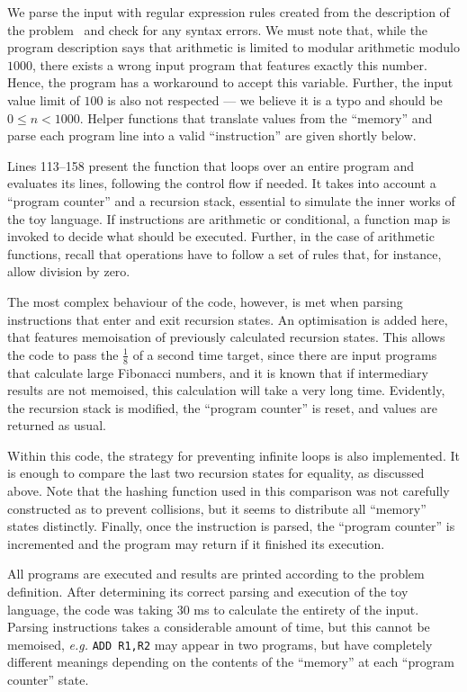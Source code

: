 \documentclass[12pt]{article}
\begin{document}
We parse the input with regular expression rules created from the description of the problem~\cite{Demasi:misc:2013:may} and check for any syntax errors. We must note that, while the program description says that arithmetic is limited to modular arithmetic modulo $1000$, there exists a wrong input program that features exactly this number. Hence, the program has a workaround to accept this variable. Further, the input value limit of $100$ is also not respected --- we believe it is a typo and should be $0 \leq n < 1000$. Helper functions that translate values from the ``memory'' and parse each program line into a valid ``instruction'' are given shortly below.

Lines 113--158 present the function that loops over an entire program and evaluates its lines, following the control flow if needed. It takes into account a ``program counter'' and a recursion stack, essential to simulate the inner works of the toy language. If instructions are arithmetic or conditional, a function map is invoked to decide what should be executed. Further, in the case of arithmetic functions, recall that operations have to follow a set of rules that, for instance, allow division by zero.

The most complex behaviour of the code, however, is met when parsing instructions that enter and exit recursion states. An optimisation is added here, that features memoisation of previously calculated recursion states. This allows the code to pass the $\frac{1}{8}$ of a second time target, since there are input programs that calculate large Fibonacci numbers, and it is known that if intermediary results are not memoised, this calculation will take a very long time. Evidently, the recursion stack is modified, the ``program counter'' is reset, and values are returned as usual.

Within this code, the strategy for preventing infinite loops is also implemented. It is enough to compare the last two recursion states for equality, as discussed above. Note that the hashing function used in this comparison was not carefully constructed as to prevent collisions, but it seems to distribute all ``memory'' states distinctly. Finally, once the instruction is parsed, the ``program counter'' is incremented and the program may return if it finished its execution.

All programs are executed and results are printed according to the problem definition. After determining its correct parsing and execution of the toy language, the code was taking $30$ ms to calculate the entirety of the input. Parsing instructions takes a considerable amount of time, but this cannot be memoised, \emph{e.g.} \texttt{ADD R1,R2} may appear in two programs, but have completely different meanings depending on the contents of the ``memory'' at each ``program counter'' state.
\end{document}
